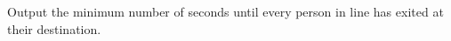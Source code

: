 
  Output the minimum number of seconds until every person in line has exited at their destination.
